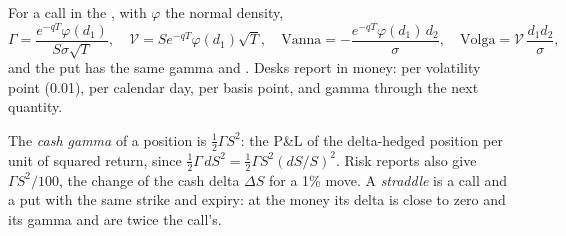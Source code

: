 For a call in the , with $\varphi$ the normal density,
\[
\Gamma=\frac{e^{-qT}\varphi(d_1)}{S\sigma\sqrt T},\quad
\mathcal V=Se^{-qT}\varphi(d_1)\sqrt T,\quad
\mathrm{Vanna}=-\frac{e^{-qT}\varphi(d_1)\,d_2}{\sigma},\quad
\mathrm{Volga}=\mathcal V\,\frac{d_1d_2}{\sigma},
\]
and the put has the same gamma and . Desks report  in money:  per
volatility point (0.01),  per calendar day,  per basis point, and gamma
through the next quantity.

\begin{definition}\label{def:dv:greeks-and-the-hedging-pnl:cashgamma}
The \emph{cash gamma} of a position is $\tfrac12\Gamma S^2$: the P\&L
of the delta-hedged position per unit of squared return, since
$\tfrac12\Gamma\,dS^2=\tfrac12\Gamma S^2(dS/S)^2$. Risk reports also give
$\Gamma S^2/100$, the change of the cash delta $\Delta S$ for a 1\% move. A
\emph{straddle} is a call and a put with the same strike and expiry:
at the money its delta is close to zero and its gamma and  are twice the
call's.
\end{definition}

